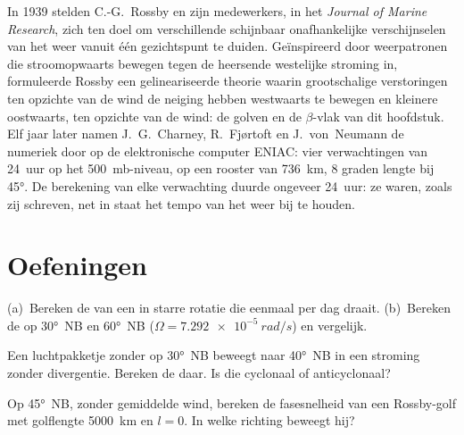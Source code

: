 \begin{history}
In 1939 stelden C.-G.~Rossby en zijn medewerkers, in het \emph{Journal of Marine
Research}, zich ten doel om verschillende schijnbaar onafhankelijke verschijnselen
van het weer vanuit één gezichtspunt te duiden. Geïnspireerd door weerpatronen die
stroomopwaarts bewegen tegen de heersende westelijke stroming in, formuleerde Rossby
een gelineariseerde theorie waarin grootschalige verstoringen ten opzichte van de wind de neiging hebben westwaarts te bewegen
en kleinere oostwaarts, ten opzichte van de wind: de golven en de
$\beta$-vlak van dit hoofdstuk. Elf jaar later namen J.~G.~Charney,
R.~Fjørtoft en J.~von~Neumann de 
numeriek door op de elektronische computer ENIAC: vier verwachtingen van 24~uur op
het \qty{500}{mb}-niveau, op een rooster van \qty{736}{km}, 8 graden lengte
bij \ang{45}. De berekening van elke verwachting duurde ongeveer 24~uur: ze
waren, zoals zij schreven, net in staat het tempo van het weer bij te houden.
\end{history}

\section{Oefeningen}

\begin{exercise}[$\star$]\label{exo:b3:atmospheric-dynamics:1}
(a)~Bereken de  van een  in starre rotatie die
eenmaal per dag draait. (b)~Bereken de  op \ang{30}~NB en \ang{60}~NB
($\Omega = \qty{7.292e-5}{rad/s}$) en vergelijk.
\end{exercise}

\begin{exercise}[$\star$]\label{exo:b3:atmospheric-dynamics:2}
Een luchtpakketje zonder  op \ang{30}~NB beweegt naar \ang{40}~NB in een
stroming zonder divergentie. Bereken de  daar. Is die
cyclonaal of anticyclonaal?
\end{exercise}

\begin{exercise}[$\star$]\label{exo:b3:atmospheric-dynamics:3}
Op \ang{45}~NB, zonder gemiddelde wind, bereken de fasesnelheid van een Rossby-golf
met golflengte \qty{5000}{km} en $l = 0$. In welke richting beweegt hij?
\end{exercise}

